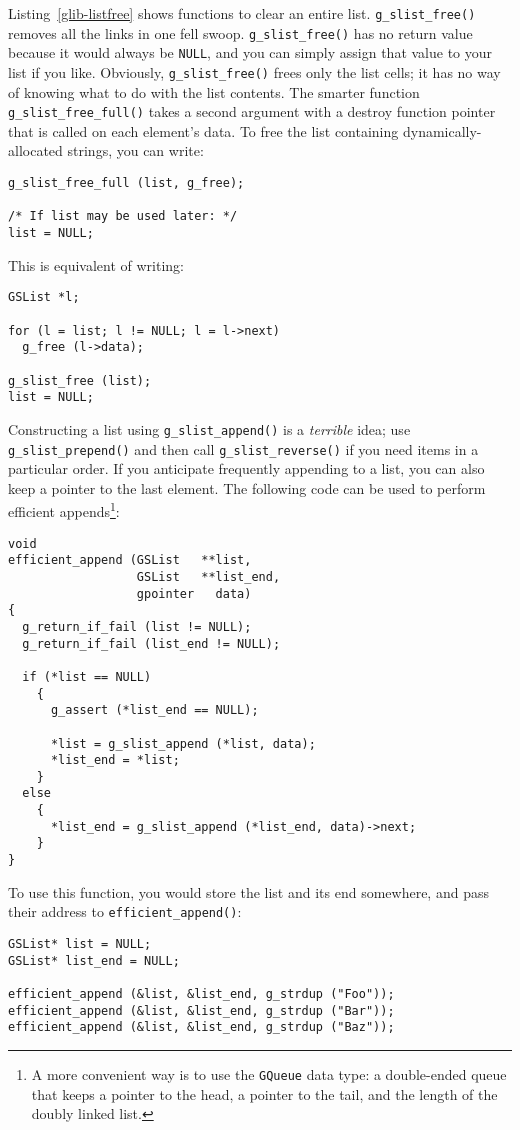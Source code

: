 Listing~\ref{glib-listfree} shows functions to clear an entire list. \lstinline{g_slist_free()} removes all the links in one fell swoop. \lstinline{g_slist_free()} has no return value because it would always be \lstinline{NULL}, and you can simply assign that value to your list if you like. Obviously, \lstinline{g_slist_free()} frees only the list cells; it has no way of knowing what to do with the list contents. The smarter function \lstinline{g_slist_free_full()} takes a second argument with a destroy function pointer that is called on each element's data. To free the list containing dynamically-allocated strings, you can write:
\begin{lstlisting}
g_slist_free_full (list, g_free);

/* If list may be used later: */
list = NULL;
\end{lstlisting}

This is equivalent of writing:
\begin{lstlisting}
GSList *l;

for (l = list; l != NULL; l = l->next)
  g_free (l->data);

g_slist_free (list);
list = NULL;
\end{lstlisting}

Constructing a list using \lstinline{g_slist_append()} is a \emph{terrible} idea; use \lstinline{g_slist_prepend()} and then call \lstinline{g_slist_reverse()} if you need items in a particular order. If you anticipate frequently appending to a list, you can also keep a pointer to the last element. The following code can be used to perform efficient appends\footnote{A more convenient way is to use the \lstinline{GQueue} data type: a double-ended queue that keeps a pointer to the head, a pointer to the tail, and the length of the doubly linked list.}:

\pagebreak[2]
\begin{lstlisting}
void
efficient_append (GSList   **list,
                  GSList   **list_end,
                  gpointer   data)
{
  g_return_if_fail (list != NULL);
  g_return_if_fail (list_end != NULL);

  if (*list == NULL)
    {
      g_assert (*list_end == NULL);

      *list = g_slist_append (*list, data);
      *list_end = *list;
    }
  else
    {
      *list_end = g_slist_append (*list_end, data)->next;
    }
}
\end{lstlisting}

To use this function, you would store the list and its end somewhere, and pass their address to \lstinline{efficient_append()}:
\begin{lstlisting}
GSList* list = NULL;
GSList* list_end = NULL;

efficient_append (&list, &list_end, g_strdup ("Foo"));
efficient_append (&list, &list_end, g_strdup ("Bar"));
efficient_append (&list, &list_end, g_strdup ("Baz"));
\end{lstlisting}


